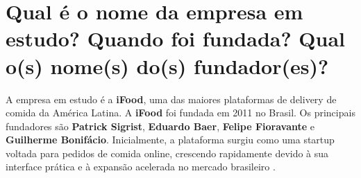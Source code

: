 \section{Qual é o nome da empresa em estudo? Quando foi fundada? Qual o(s) nome(s) do(s) fundador(es)?}

A empresa em estudo é a \textbf{iFood}, uma das maiores plataformas de delivery de comida da América Latina. A \textbf{iFood} foi fundada em 2011 no Brasil. Os principais fundadores são \textbf{Patrick Sigrist}, \textbf{Eduardo Baer}, \textbf{Felipe Fioravante} e \textbf{Guilherme Bonifácio}. Inicialmente, a plataforma surgiu como uma startup voltada para pedidos de comida online, crescendo rapidamente devido à sua interface prática e à expansão acelerada no mercado brasileiro \cite{ifood2023}.
